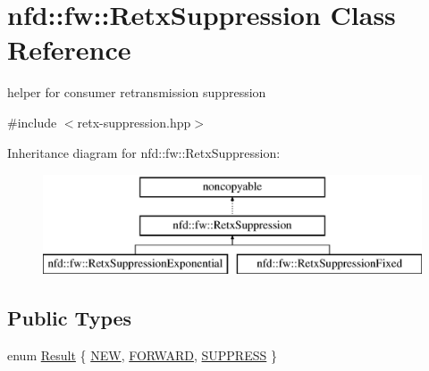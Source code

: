 \hypertarget{classnfd_1_1fw_1_1RetxSuppression}{}\section{nfd\+:\+:fw\+:\+:Retx\+Suppression Class Reference}
\label{classnfd_1_1fw_1_1RetxSuppression}


helper for consumer retransmission suppression  




{\ttfamily \#include $<$retx-\/suppression.\+hpp$>$}

Inheritance diagram for nfd\+:\+:fw\+:\+:Retx\+Suppression\+:\begin{figure}[H]
\begin{center}
\leavevmode
\includegraphics[height=3.000000cm]{classnfd_1_1fw_1_1RetxSuppression}
\end{center}
\end{figure}
\subsection*{Public Types}
\begin{DoxyCompactItemize}
\item 
enum \hyperlink{classnfd_1_1fw_1_1RetxSuppression_af3180f6ce660253c6b415057b817af82}{Result} \{ \hyperlink{classnfd_1_1fw_1_1RetxSuppression_af3180f6ce660253c6b415057b817af82ae51a76a93e6e35971891561c8770b763}{N\+EW}, 
\hyperlink{classnfd_1_1fw_1_1RetxSuppression_af3180f6ce660253c6b415057b817af82a84808d86908c90a7adf26b5d5cc6bb5a}{F\+O\+R\+W\+A\+RD}, 
\hyperlink{classnfd_1_1fw_1_1RetxSuppression_af3180f6ce660253c6b415057b817af82aacf1f63146288f69dab72a76d00e6daa}{S\+U\+P\+P\+R\+E\+SS}
 \}
\end{DoxyCompactItemize}

